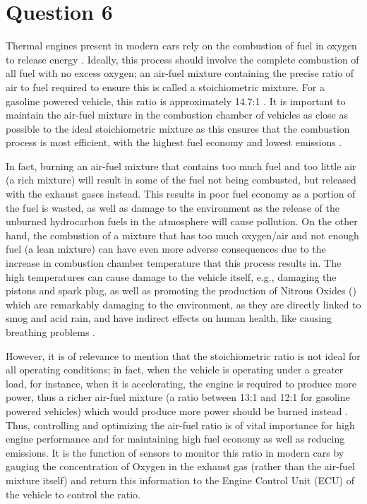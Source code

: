 \section{Question 6}
Thermal engines present in modern cars rely on the combustion of fuel in oxygen to release energy \cite{q6-r1}. Ideally, this process should involve the complete combustion of all fuel with no excess oxygen; an air-fuel mixture containing the precise ratio of air to fuel required to ensure this is called a stoichiometric mixture. For a gasoline powered vehicle, this ratio is approximately 14.7:1 \cite{q6-r1}. It is important to maintain the air-fuel mixture in the combustion chamber of vehicles as close as possible to the ideal stoichiometric mixture as this ensures that the combustion process is most efficient, with the highest fuel economy and lowest emissions \cite{q6-r2}.

In fact, burning an air-fuel mixture that contains too much fuel and too little air (a rich mixture) will result in some of the fuel not being combusted, but released with the exhaust gases instead. This results in poor fuel economy as a portion of the fuel is wasted, as well as damage to the environment as the release of the unburned hydrocarbon fuels in the atmosphere will cause pollution. On the other hand, the combustion of a mixture that has too much oxygen/air and not enough fuel (a lean mixture) can have even more adverse consequences due to the increase in combustion chamber temperature that this process results in. The high temperatures can cause damage to the vehicle itself, e.g., damaging the pistons and spark plug, as well as promoting the production of Nitrous Oxides ()  which are remarkably damaging to the environment, as they are directly linked to smog and acid rain, and have indirect effects on human health, like causing breathing problems \cite{q6-r2} \cite{q6-r3} \cite{q6-r4}.

However, it is of relevance to mention that the stoichiometric ratio is not ideal for all operating conditions; in fact, when the vehicle is operating under a greater load, for instance, when it is accelerating, the engine is required to produce more power, thus a richer air-fuel mixture (a ratio between 13:1 and 12:1 for gasoline powered vehicles) which would produce more power should be burned instead \cite{q6-r4}. Thus, controlling and optimizing the air-fuel ratio is of vital importance for high engine performance and for maintaining high fuel economy as well as reducing emissions. It is the function of  sensors to monitor this ratio in modern cars by gauging the concentration of Oxygen in the exhaust gas (rather than the air-fuel mixture itself) and return this information to the Engine Control Unit (ECU) of the vehicle to control the ratio.

